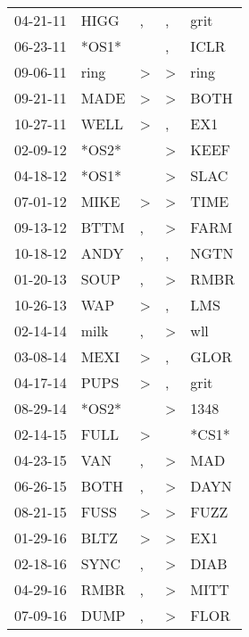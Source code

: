 \begin{supertabular}{lllll}
 04-21-11 &   HIGG &                , &                , &   grit \\
 06-23-11 &  *OS1* &                  &                , &   ICLR \\
 09-06-11 &   ring &     \textgreater &     \textgreater &   ring \\
 09-21-11 &   MADE &     \textgreater &     \textgreater &   BOTH \\
 10-27-11 &   WELL &     \textgreater &                , &    EX1 \\
 02-09-12 &  *OS2* &                  &     \textgreater &   KEEF \\
 04-18-12 &  *OS1* &                  &     \textgreater &   SLAC \\
 07-01-12 &   MIKE &     \textgreater &     \textgreater &   TIME \\
 09-13-12 &   BTTM &                , &     \textgreater &   FARM \\
 10-18-12 &   ANDY &                , &                , &   NGTN \\
 01-20-13 &   SOUP &                , &     \textgreater &   RMBR \\
 10-26-13 &    WAP &     \textgreater &                , &    LMS \\
 02-14-14 &   milk &                , &     \textgreater &    wll \\
 03-08-14 &   MEXI &     \textgreater &                , &   GLOR \\
 04-17-14 &   PUPS &     \textgreater &                , &   grit \\
 08-29-14 &  *OS2* &                  &     \textgreater &   1348 \\
 02-14-15 &   FULL &     \textgreater &                  &  *CS1* \\
 04-23-15 &    VAN &                , &     \textgreater &    MAD \\
 06-26-15 &   BOTH &                , &     \textgreater &   DAYN \\
 08-21-15 &   FUSS &     \textgreater &     \textgreater &   FUZZ \\
 01-29-16 &   BLTZ &     \textgreater &     \textgreater &    EX1 \\
 02-18-16 &   SYNC &                , &     \textgreater &   DIAB \\
 04-29-16 &   RMBR &                , &     \textgreater &   MITT \\
 07-09-16 &   DUMP &                , &     \textgreater &   FLOR \\

\end{supertabular}
